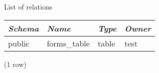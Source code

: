 \begin{center}
    List of relations
\end{center}

\begin{tabular}{l | l | l | l}
    \textit{Schema} & \textit{Name} & \textit{Type} & \textit{Owner} \\
    \hline
    public & forms\_table & table & test \\
\end{tabular}

\noindent (1 row) \\
